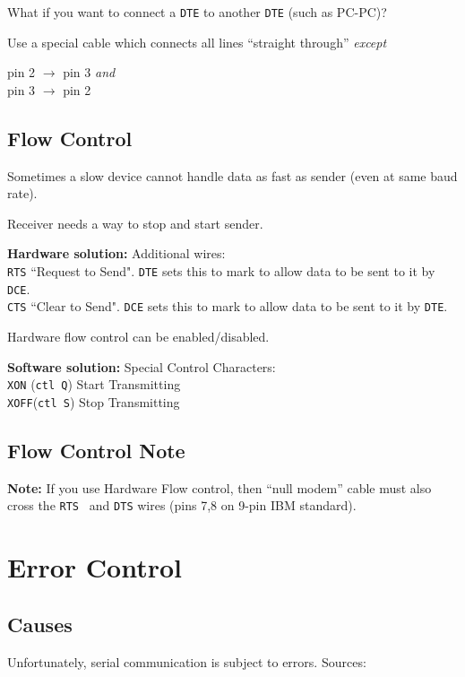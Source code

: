 \documentclass{article}	%
\begin{document}
What if you want to connect a {\tt DTE} to
another {\tt DTE} (such as PC-PC)?

Use a special cable which connects all lines
``straight through'' {\it except}

pin 2 $\to$ pin 3 {\it and} \\
pin 3 $\to$ pin 2


\subsection{Flow Control}

Sometimes a slow device cannot handle data as
fast as sender (even at same baud rate).

Receiver needs a way to stop and start sender.

{\bf Hardware solution:} Additional wires:\\
{\tt RTS} ``Request to Send".  {\tt DTE}
sets this to mark to allow data to be sent to
it by {\tt DCE}. \\
{\tt CTS} ``Clear to Send". {\tt DCE} sets this
to mark to allow data to be sent to it by {\tt DTE}.

Hardware flow control can be enabled/disabled.

{\bf Software solution:} Special Control Characters:\\
{\tt XON} ({\tt ctl Q}) Start Transmitting\\
{\tt XOFF}({\tt ctl S}) Stop Transmitting



\subsection{Flow Control Note}

{\bf Note:}  If you use Hardware Flow control,
then ``null modem'' cable must also cross the
{\tt RTS } and {\tt DTS} wires (pins 7,8 on 9-pin
IBM standard).



\section{Error Control}
\subsection{Causes}
Unfortunately, serial communication is subject
to errors.  Sources:
\end{document}
